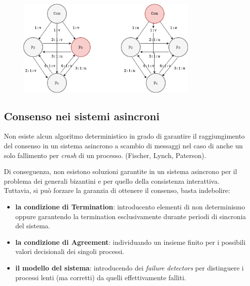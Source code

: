 \begin{figure}[ht]
    \centering
    \includegraphics[width=9cm]{./Images/cap2/2.5.png}
    \label{fig:image2.5}
\end{figure}

\subsection{Consenso nei sistemi asincroni}
Non esiste alcun algoritmo deterministico in grado di garantire il raggiungimento del consenso in un sistema asincrono a scambio di messaggi nel caso di anche un solo fallimento per \textit{crash} di un processo. (Fischer, Lynch, Paterson).

Di conseguenza, non esistono soluzioni garantite in un sistema asincrono per il problema dei generali bizantini e per quello della consistenza interattiva. Tuttavia, si può forzare la garanzia di ottenere il consenso, basta indebolire: 
\begin{itemize}
    \item \textbf{la condizione di Termination}: introducento elementi di non determinismo oppure garantendo la termination esclusivamente durante periodi di sincronia del sistema.
    \item \textbf{la condizione di Agreement}: individuando un insieme finito per i possibili valori decisionali dei singoli processi.
    \item \textbf{il modello del sistema}: introducendo dei \textit{failure detectors} per distinguere i processi lenti (ma corretti) da quelli effettivamente falliti.
\end{itemize}

